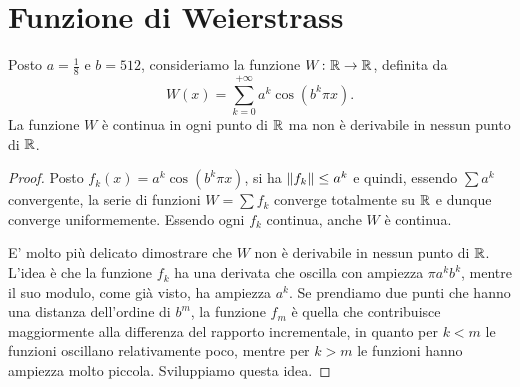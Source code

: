 \section{Funzione di Weierstrass}
\begin{example}[Weierstrass]
Posto $a=\frac 1 8$ e $b=512$, 
consideriamo la funzione $W\colon {\mathbb R} \to {\mathbb R}$, definita da
\[
   W(x) = \sum_{k=0}^{+\infty} a^k \cos(b^k \pi x).
\]
La funzione $W$ 
è continua in ogni punto di ${\mathbb R}$ 
ma non è derivabile in nessun punto di ${\mathbb R}$.
\end{example}
\begin{proof}
Posto $f_k(x) = a^k \cos(b^k \pi x)$,
si ha ${\left\Vert f_k\right\Vert} \leq a^k$ e quindi, essendo $\sum a^k$ convergente, 
la serie di funzioni $W = \sum f_k$
converge totalmente su ${\mathbb R}$ e dunque converge uniformemente.
Essendo ogni $f_k$ continua, anche $W$ è continua.

E' molto più delicato dimostrare che $W$ non è derivabile in nessun punto di ${\mathbb R}$.
L'idea è che la funzione $f_k$ ha una derivata 
che oscilla con ampiezza $\pi a^k b^k$, mentre il suo modulo, come già visto,
ha ampiezza $a^k$. 
Se prendiamo due punti che hanno una distanza dell'ordine di $b^m$,
la funzione $f_m$ è quella che contribuisce maggiormente alla differenza 
del rapporto incrementale, in quanto per $k<m$ le funzioni oscillano relativamente 
poco, mentre per $k>m$ le funzioni hanno ampiezza molto piccola.
Sviluppiamo questa idea.


\end{proof}
